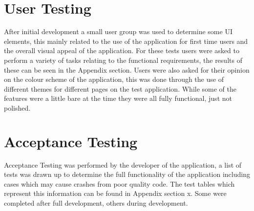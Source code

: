 \section{User Testing}
After initial development a small user group was used to determine some UI elements, this mainly related to the use of the application for first time users and the overall visual appeal of the application. For these tests users were asked to perform a variety of tasks relating to the functional requirements, the results of these can be seen in the Appendix section. Users were also asked for their opinion on the colour scheme of the application, this was done through the use of different themes for different pages on the test application. While some of the features were a little bare at the time they were all fully functional, just not polished. 
\section{Acceptance Testing}
Acceptance Testing was performed by the developer of the application, a list of tests was drawn up to determine the full functionality of the application including cases which may cause crashes from poor quality code. The test tables which represent this information can be found in Appendix section x. Some were completed after full development, others during development.